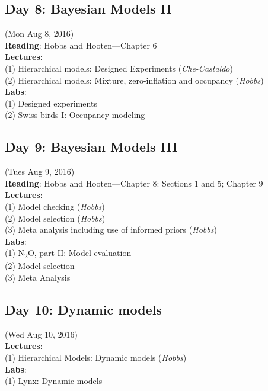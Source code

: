 \documentclass[12pt, oneside]{article}
\begin{document}
\subsection*{Day 8: Bayesian Models II} (Mon Aug 8, 2016)\\
\textbf{Reading}: Hobbs and Hooten---Chapter 6\\
\textbf{Lectures}: \\
(1) Hierarchical models: Designed Experiments (\emph{Che-Castaldo}) \\
(2) Hierarchical models: Mixture, zero-inflation and occupancy (\emph{Hobbs})\\
\textbf{Labs}: \\
(1) Designed experiments \\
(2) Swiss birds I: Occupancy modeling\\

\subsection*{Day 9: Bayesian Models III} (Tues Aug 9, 2016)\\
\textbf{Reading}: Hobbs and Hooten---Chapter 8: Sections 1 and 5; Chapter 9\\
\textbf{Lectures}: \\
(1) Model checking (\emph{Hobbs})\\
(2) Model selection (\emph{Hobbs})\\
(3) Meta analysis including use of informed priors (\emph{Hobbs}) \\
\textbf{Labs}: \\
(1) N\textsubscript{2}O, part II: Model evaluation\\
(2) Model selection\\
(3) Meta Analysis \\

\subsection*{Day 10: Dynamic models} (Wed Aug 10, 2016)\\
\textbf{Lectures}: \\
(1) Hierarchical Models: Dynamic models (\emph{Hobbs})\\
\textbf{Labs}: \\
(1) Lynx: Dynamic models\\
\end{document}

